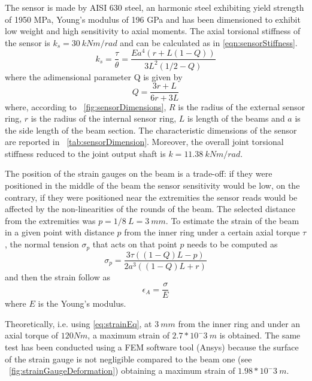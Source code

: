 \documentclass[journal]{IEEEtran}
\begin{document}
%
The sensor is made by AISI 630 steel, an harmonic steel exhibiting yield strength of 1950 MPa, Young's modulus of 196 GPa and has been dimensioned to exhibit low weight and high sensitivity to axial moments.
The axial torsional stiffness of the sensor is $k_s = 30 \ kNm/rad$ and can be calculated as in \eqref{eqn:sensorStiffness}.
\begin{equation}
\label{eqn:sensorStiffness}
k_{s} = \frac{\tau}{\theta} = \frac{Ea^4(r+L(1-Q))}{3L^2(1/2-Q)}	
\end{equation}
where the adimensional parameter Q is given by
\begin{equation}
\label{eqn:adimensionalQ}
Q = \frac{3r+L}{6r+3L}	
\end{equation}
where, according to \figurename \ \ref{fig:sensorDimensions}, $R$ is the radius of the external sensor ring, $r$ is the radius of the internal sensor ring, $L$ is length of the beams and $a$ is the side length of the beam section.
The characteristic dimensions of the sensor are reported in \tablename \ \ref{tab:sensorDimension}.
Moreover, the overall joint torsional stiffness reduced to the joint output shaft is $k = 11.38\ kNm/rad$.
\par The position of the strain gauges on the beam is a trade-off: if they were positioned in the middle of the beam the sensor sensitivity would be low, on the contrary, if they were positioned near the extremities the sensor reads would be affected by the non-linearities of the rounds of the beam. The selected distance from the extremities was $p = 1/8 \ L = 3 \ mm$.
To estimate the strain of the beam in a given point with distance $p$ from the inner ring under a certain axial torque $\tau$, the normal tension $\sigma_p$ that acts on that point $p$ needs to be computed as
\begin{equation}
\label{eqn:normalTensionOnBeam}
\sigma_p = \frac{3\tau((1-Q)L-p)}{2a^3((1-Q)L+r)}	
\end{equation}
and then the strain follow as 
\begin{equation}
\label{eq:strainEq}
\epsilon_A= \frac{\sigma}{E}
\end{equation} 
where $E$ is the Young's modulus.
\par Theoretically, i.e. using \eqref{eq:strainEq}, at $3 \ mm$ from the inner ring and under an axial torque of $120 Nm$,  a maximum strain of $2.7*10^-3 \ m$ is obtained.
The same test has been conducted using a FEM software tool (Ansys\textregistered) because the surface of the strain gauge is not negligible compared to the beam one (see \figurename \ \ref{fig:strainGaugeDeformation}) obtaining a maximum strain of $1.98*10^-3 \ m$.
\end{document}
